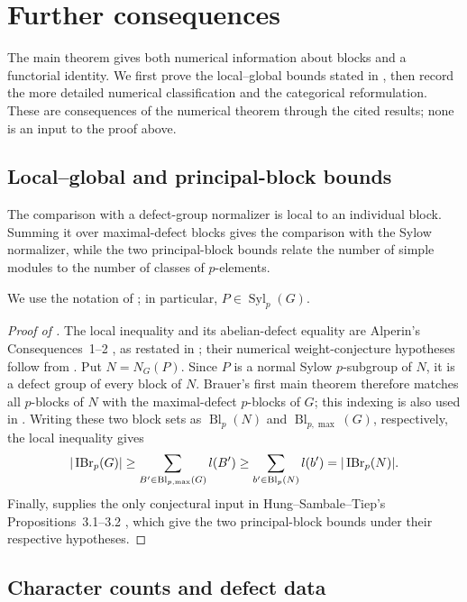 \section{Further consequences}\label{sec:consequences}

The main theorem gives both numerical information about blocks and a
functorial identity. We first prove the local--global bounds stated in
, then record the more detailed numerical
classification and the categorical reformulation. These are consequences
of the numerical theorem through the cited results; none is an input
to the proof above.

\subsection{Local--global and principal-block bounds}

The comparison with a defect-group normalizer is local to an individual
block. Summing it over maximal-defect blocks gives the comparison with
the Sylow normalizer, while the two principal-block bounds relate the
number of simple modules to the number of classes of $p$-elements.

We use the notation of ; in particular,
$P\in\operatorname{Syl}_p(G)$.

\begin{proof}[Proof of ]
The local inequality and its abelian-defect equality are Alperin's Consequences~1--2
\cite{Alperin1987}, as restated in \cite[Section~3, p.~334]{HST2024};
their numerical weight-conjecture hypotheses follow from .
Put $N=N_G(P)$. Since $P$ is a normal Sylow $p$-subgroup of $N$,
it is a defect group of every block of $N$.
Brauer's first main theorem therefore matches all $p$-blocks of $N$
with the maximal-defect $p$-blocks of $G$; this indexing is also used in
\cite[proof of Lemma~2.14]{FMR2025}. Writing these two block sets as
$\operatorname{Bl}_p(N)$ and $\operatorname{Bl}_{p,\max}(G)$, respectively,
the local inequality gives
\[
 |\operatorname{IBr}_p(G)|
 \geq\sum_{B'\in\operatorname{Bl}_{p,\max}(G)}l(B')
 \geq\sum_{b'\in\operatorname{Bl}_p(N)}l(b')
 =|\operatorname{IBr}_p(N)|.
\]
Finally,  supplies the only conjectural input in
Hung--Sambale--Tiep's Propositions~3.1--3.2 \cite{HST2024}, which give
the two principal-block bounds under their respective hypotheses.
\end{proof}

\subsection{Character counts and defect data}

